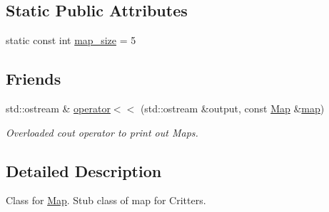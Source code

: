 \subsection*{Static Public Attributes}
\begin{DoxyCompactItemize}
\item 
static const int \hyperlink{class_map_a6f922edb15340e98aee860d269e50703}{map\+\_\+size} = 5
\end{DoxyCompactItemize}
\subsection*{Friends}
\begin{DoxyCompactItemize}
\item 
std\+::ostream \& \hyperlink{class_map_aebdb7e7ad7d1b28f8e1b3a0b0917bb9c}{operator$<$$<$} (std\+::ostream \&output, const \hyperlink{class_map}{Map} \&\hyperlink{class_map_aa5d63b554ad19c18cdc9911536e42001}{map})
\begin{DoxyCompactList}\small\item\em Overloaded cout operator to print out Maps. \end{DoxyCompactList}\end{DoxyCompactItemize}


\subsection{Detailed Description}
Class for \hyperlink{class_map}{Map}. Stub class of map for Critters. 

